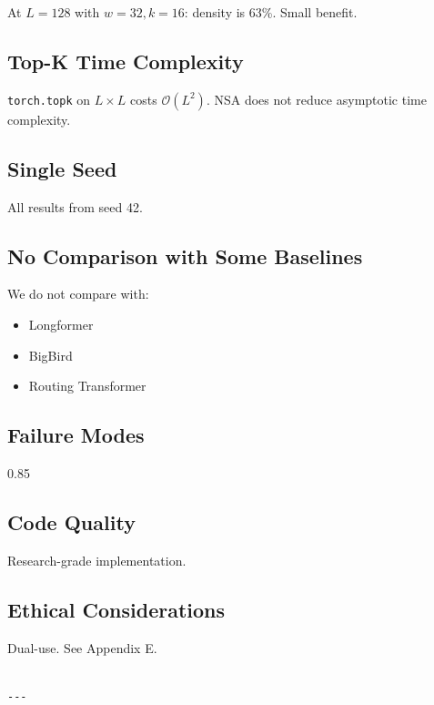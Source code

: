 At $L = 128$ with $w = 32, k = 16$: density is 63\%. Small benefit.

\subsection{Top-K Time Complexity}

\texttt{torch.topk} on $L \times L$ costs $\mathcal{O}(L^2)$. NSA does not reduce 
asymptotic time complexity.

\subsection{Single Seed}

All results from seed 42.

\subsection{No Comparison with Some Baselines}

We do not compare with:
\begin{itemize}
\item Longformer
\item BigBird
\item Routing Transformer

\end{itemize}
\subsection{Failure Modes}

0.85

\subsection{Code Quality}

Research-grade implementation.

\subsection{Ethical Considerations}

Dual-use. See Appendix E.
\begin{lstlisting}

---
\end{lstlisting}